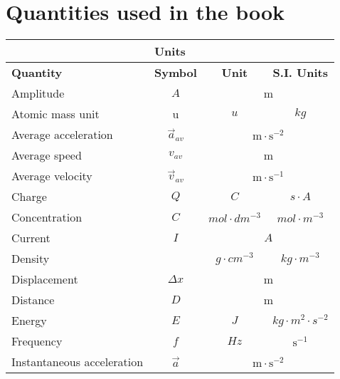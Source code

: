 \section{Quantities used in the book}
\begin{table}[H]
\begin{center}
\begin{tabular}{|l|c|c|c|}\hline \hline 
\multicolumn{4}{|c|}{\textbf{Units}}\\ \hline \hline
\textbf{Quantity}          & \textbf{Symbol} & \textbf{Unit}           & \textbf{S.I. Units}        \\ \hline
Amplitude                  & $A$             & \multicolumn{2}{c|}{m}                               \\ \hline
Atomic mass unit           & u               & $u$                     & $kg$                       \\ \hline
Average acceleration       & $\vec{a}_{av}$  & \multicolumn{2}{c|}{$\text{m} \cdot \text{s}^{-2}$}  \\ \hline
Average speed              & $v_{av}$        & \multicolumn{2}{c|}{m}                               \\ \hline
Average velocity           & $\vec{v}_{av}$  & \multicolumn{2}{c|}{$\text{m} \cdot \text{s}^{-1}$}  \\ \hline
Charge                     & $Q$             & $C$                     & $s \cdot A$                \\ \hline
Concentration              & $C$             & $mol \cdot dm^{-3}$     & $mol \cdot m^{-3}$         \\ \hline
Current                    & $I$             & \multicolumn{2}{c|}{$A$}                             \\ \hline
Density                    &                 & $g \cdot cm^{-3}$       & $kg \cdot m^{-3}$          \\ \hline
Displacement               & $\Delta x$      & \multicolumn{2}{c|}{m}                               \\ \hline
Distance                   & $D$             & \multicolumn{2}{c|}{m}                               \\ \hline
Energy                     & $E$             & $J$                     & $kg \cdot m^{2} \cdot s^{-2}$  \\ \hline
Frequency                  & $f$             & $Hz$ & $\text{s}^{-1}$                               \\ \hline
Instantaneous acceleration & $\vec{a}$       & \multicolumn{2}{c|}{$\text{m} \cdot \text{s}^{-2}$}  \\ \hline

\end{tabular}
\end{center}
\end{table}
